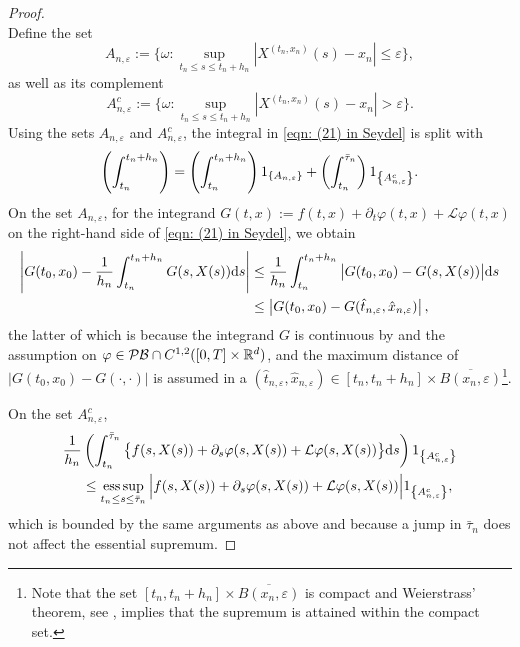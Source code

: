 \begin{proof}
\begin{equation*}
    \end{equation*}
    Define the set
    \begin{equation*}
        A_{n,\varepsilon} := \{ \omega : \sup_{t_n \leq s \leq t_n + h_n} |X^{(t_n,x_n)}(s) - x_n| \leq \varepsilon \},
    \end{equation*}
    as well as its complement
    \begin{equation*}
        A_{n,\varepsilon}^c := \{ \omega : \sup_{t_n \leq s \leq t_n + h_n} |X^{(t_n,x_n)}(s) - x_n| > \varepsilon \}.
    \end{equation*}
    Using the sets $A_{n,\varepsilon}$ and $A_{n,\varepsilon}^c$, the integral in \eqref{eqn: (21) in Seydel} is split with
    \begin{equation}
        \left( \int_{t_n}^{t_n+h_n}\right) = \left( \int_{t_n}^{t_n+h_n}\right) 1_{\left\{A_{n,\varepsilon}\right\}} + \left( \int_{t_n}^{\bar \tau_n}\right) 1_{\left\{A_{n,\varepsilon}^c\right\}}.
        \label{eqn: Theorem 4.9, split equation}
    \end{equation}
    On the set $A_{n,\varepsilon}$, for the integrand $G(t,x) := f(t,x) + \partial_t \varphi (t,x) + \mathcal L \varphi(t,x)$ on the right-hand side of \eqref{eqn: (21) in Seydel}, we obtain
    \begin{align}
        \left| G(t_0,x_0) - \frac{1}{h_n} \int_{t_n}^{t_n+h_n} G(s,X(s)) \mathrm{d} s \right| &\leq \frac{1}{h_n} \int_{t_n}^{t_n+h_n} \big| G(t_0,x_0) - G(s,X(s))\big| \mathrm{d} s \nonumber \\
        & \leq \left| G(t_0,x_0) - G(\hat{t}_{n,\varepsilon},\hat{x}_{n,\varepsilon}) \right|,
        \label{eqn: (22) in Seydel}
    \end{align}
    the latter of which is because the integrand $G$ is continuous by  and the assumption on $\varphi \in \mathcal{PB} \cap C^{1,2}([0,T] \times \mathbb{R}^d)$, and the maximum distance of $|G(t_0,x_0) - G(\cdot, \cdot)|$ is assumed in a $(\hat{t}_{n,\varepsilon},\hat{x}_{n,\varepsilon}) \in [t_n, t_n + h_n] \times \overline{B(x_n,\varepsilon)}$\footnote{Note that the set $[t_n,t_n+h_n] \times \overline{B(x_n,\varepsilon)}$ is compact and Weierstrass' theorem, see \cite[Theorem 3.12 (Extreme-value theorem)]{ProtterMorrey1991FirstCourseRealAnalysis}, implies that the supremum is attained within the compact set.}.

    On the set $A_{n,\varepsilon}^c$,
    \begin{align*}
        \frac{1}{h_n} & \left( \int_{t_n}^{\bar \tau_n} \big\{f(s,X(s)) + \partial_s \varphi(s,X(s)) + \mathcal{L}\varphi(s,X(s)) \big\} \mathrm{d} s \right) 1_{\left\{A_{n,\varepsilon}^c\right\}} \\
        & \leq \operatorname*{ess\,sup}_{t_n \leq s \leq \Bar{\tau}_n} \Big| f(s,X(s)) + \partial_s \varphi(s,X(s)) + \mathcal L \varphi(s,X(s)) \Big| 1_{\left\{A_{n,\varepsilon}^c\right\}},
    \end{align*}
    which is bounded by the same arguments as above and because a jump in $\bar \tau_n$ does not affect the essential supremum. 


\end{proof}
